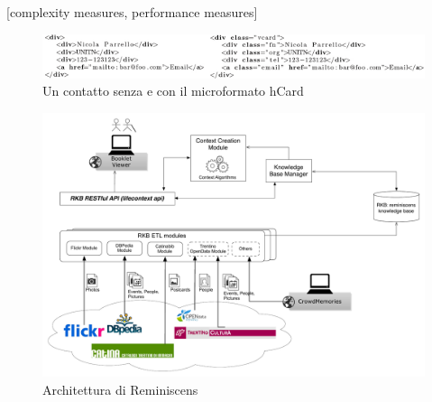 \documentclass{acm_proc_article-sp}
\begin{document}
[complexity measures, performance measures]





\begin{figure}[t]
\centering
\includegraphics[width=1.0\textwidth]{microformats.pdf}
\caption{Un contatto senza e con il microformato hCard}
\label{fig:microformats}
\end{figure}





\begin{figure}[t]
\centering
\includegraphics[width=1.0\textwidth]{architecture.pdf}
\caption{Architettura di Reminiscens}
\end{figure}


\end{document}
